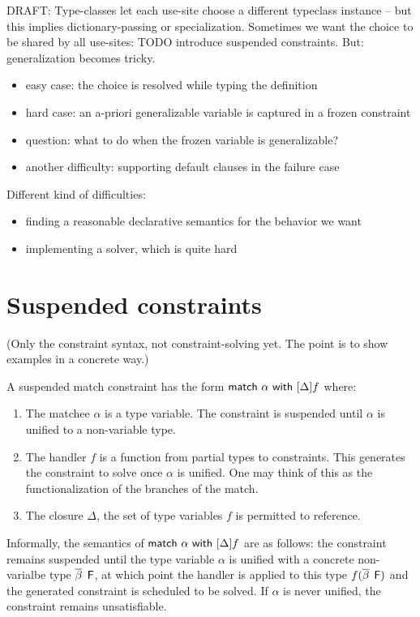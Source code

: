 \documentclass[acmsmall,screen,nonacm]{acmart}
\begin{document}
DRAFT: Type-classes let each use-site choose a different typeclass instance -- but this implies dictionary-passing or specialization. Sometimes we want the choice to be shared by all use-sites: TODO introduce suspended constraints. But: generalization becomes tricky.
\begin{itemize}
\item easy case: the choice is resolved while typing the definition
\item hard case: an a-priori generalizable variable is captured in a frozen constraint
\item question: what to do when the frozen variable is generalizable?
\item another difficulty: supporting default clauses in the failure case
\end{itemize}

Different kind of difficulties:
\begin{itemize}
\item finding a reasonable declarative semantics for the behavior we want
\item implementing a solver, which is quite hard
\end{itemize}

\section{Suspended constraints}

(Only the constraint syntax, not constraint-solving yet. The point is to show examples in a concrete way.)

A suspended match constraint has the form $\mathsf{match} ~ \alpha ~ \mathsf{with} ~ [ \Delta ] f$ where: 
\begin{enumerate}
  \item The matchee $\alpha$ is a type variable. The constraint is suspended until $\alpha$ is unified to a non-variable type. 
  \item The handler $f$ is a function from partial types to constraints. This generates the constraint to solve once $\alpha$ is unified. One may think of this as the functionalization of the branches of the match. 
  \item The closure $\Delta$, the set of type variables $f$ is permitted to reference. 
\end{enumerate}

Informally, the semantics of $\mathsf{match} ~ \alpha ~ \mathsf{with} ~ [ \Delta ] f$ are as follows: the constraint remains suspended until the type variable $\alpha$ is 
unified with a concrete non-varialbe type $\overline{\beta} \mathop{}\mathrel{\mathsf{F}}$, at which point the handler 
is applied to this type $f(\overline{\beta} \mathop{}\mathrel{\mathsf{F}})$ and the generated constraint is scheduled to 
be solved. If $\alpha$ is never unified, the constraint remains unsatisfiable. 
\end{document}
